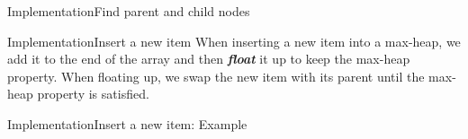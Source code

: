 \documentclass[aspectratio=169]{ctexbeamer}
\newcommand{\highlight}[1]{\textbf{\textit{#1}}}
\begin{document}
    \begin{frame}{Implementation}{Find parent and child nodes}
        \begin{algorithm}[H]
            \caption{Find parent and child nodes}
            \label{algo:Find parent and child nodes}
    
            \BlankLine
    
    
            \BlankLine
    
        \end{algorithm}
    \end{frame}

    \begin{frame}{Implementation}{Insert a new item}
        When inserting a new item into a max-heap, we add it to the end of the array and then \highlight{float} it up to keep the max-heap property. When floating up, we swap the new item with its parent until the max-heap property is satisfied.
    \end{frame}

    \begin{frame}{Implementation}{Insert a new item: Example}
        \begin{figure}[!htbp]
            \centering
        \end{figure}
    \end{frame}
\end{document}
